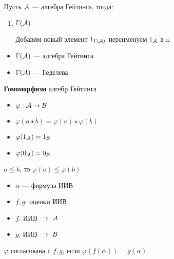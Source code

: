 \documentclass[english]{article}
\begin{document}
\begin{definition}
	Пусть \(\mathcal{A}\) --- алгебра Гейтинга, тогда:
	\begin{enumerate}
		\item \(\Gamma(\mathcal{A})\) \\
		      \begin{center}
		      \end{center}

		      Добавим новый элемент \(1_{\Gamma(\mathcal{A})}\) переименуем \(1_{\mathcal{A}}\) в  \(\omega\)
	\end{enumerate}
	\label{org4da24e6}
\end{definition}
\begin{theorem}
	\-
	\begin{itemize}
		\item \(\Gamma(\mathcal{A})\) --- алгебра Гейтинга
		\item \(\Gamma(\mathcal{A})\) --- Геделева
	\end{itemize}
	\label{orgdc8c100}
\end{theorem}
\begin{definition}
	\textbf{Гомоморфизм} алгебр Гейтинга \\
	\begin{itemize}
		\item \(\varphi: \mathcal{A} \to \mathcal{B}\)
		\item \(\varphi(a \star b) = \varphi(a)\star\varphi(b)\)
		\item \(\varphi(1_{\mathcal{A}}) = 1_{\mathcal{B}}\)
		\item \(\varphi(0_{\mathcal{A}}) = 0_{\mathcal{B}}\)
	\end{itemize}
	\label{org7fb5121}
\end{definition}
\begin{theorem}
	\(a \le b\), то \(\varphi(a) \le \varphi(b)\)
	\label{org6aae8cf}
\end{theorem}
\begin{definition}
	\-
	\begin{itemize}
		\item \(\alpha\) --- формула ИИВ
		\item \(f, g\): оценки ИИВ
		\item \(f\): ИИВ \(\to\) \(\mathcal{A}\)
		\item \(g\): ИИВ \(\to\) \(\mathcal{B}\)
	\end{itemize}
	\(\varphi\) согласована с \(f, g\), если \(\varphi(f(\alpha)) = g(\alpha)\)
	\label{org557f5b0}
\end{definition}
\end{document}
